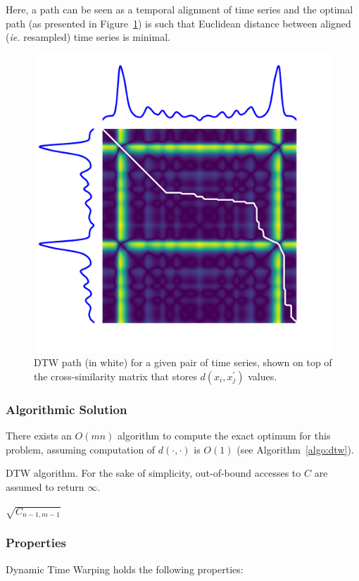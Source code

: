 Here, a path can be seen as a temporal alignment of time series and the optimal
path (as presented in Figure~\ref{fig:dtw}) is such that
Euclidean distance between aligned (\emph{ie.} resampled) time series is
minimal.

\begin{figure}[t]
\centering
\includegraphics[width=.4\textwidth]{fig/dtw}
\caption{DTW path (in white) for a given pair of time
series, shown on top of the cross-similarity matrix that stores
$d(x_i, {x}^\prime_j)$
values. \label{fig:dtw}}
\end{figure}

\subsubsection{Algorithmic Solution}

There exists an $O(mn)$ algorithm to compute the exact optimum for this
problem, assuming computation of $d(\cdot,\cdot)$ is $O(1)$
(see Algorithm~\ref{algo:dtw}).

\begin{algorithm}[t]
 \caption{DTW algorithm. For the sake of simplicity, out-of-bound accesses to $C$ are assumed to return $\infty$.}
 \label{algo:dtw}
  \Return $\sqrt{C_{n - 1, m - 1}}$
\end{algorithm}


\subsubsection{Properties}

Dynamic Time Warping holds the following properties:

